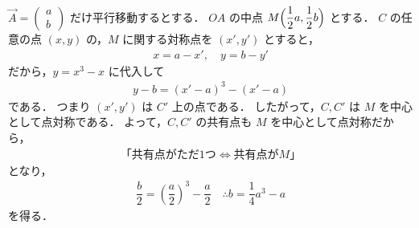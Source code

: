 \documentclass[../../main.tex]{subfiles}
\begin{document}
$\vec{A} =
\begin{pmatrix} a \\ b
\end{pmatrix}$ だけ平行移動するとする．
$OA$ の中点 $M\Bigl(\dfrac{1}{2}a, \dfrac{1}{2}b\Bigr)$ とする．
$C$ の任意の点 $(x,y)$ の，$M$ に関する対称点を $(x',y')$ とすると，
\begin{align}
  x = a - x', \quad y = b - y'
\end{align}
だから，$y = x^3 - x$ に代入して
\begin{align}
  y - b = (x'-a)^3 - (x'-a)
\end{align}
である．
つまり $(x',y')$ は $C'$ 上の点である．
したがって，$C, C'$ は $M$ を中心として点対称である．
よって，$C, C'$ の共有点も $M$ を中心として点対称だから，
\begin{align}
  \text{「共有点がただ1つ} \iff \text{共有点が} M\text{」}
\end{align}
となり，
\begin{align}
  \dfrac{b}{2} = \left(\dfrac{a}{2}\right)^3-\dfrac{a}{2} \quad \therefore b = \dfrac{1}{4}a^3 - a
\end{align}
を得る．
\end{document}
